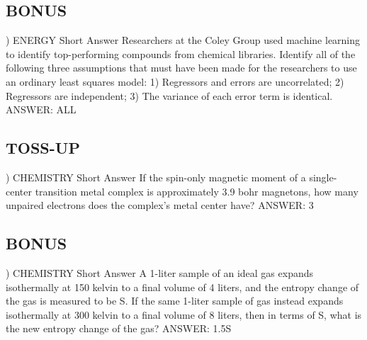 \documentclass{article}
\begin{document}
\subsection*{BONUS}
) ENERGY Short Answer Researchers at the Coley Group used machine learning to identify top-performing compounds from chemical libraries. Identify all of the following three assumptions that must have been made for the researchers to use an ordinary least squares model: 1) Regressors and errors are uncorrelated; 2) Regressors are independent; 3) The variance of each error term is identical.
\noindent ANSWER: ALL

\subsection*{TOSS-UP}
) CHEMISTRY Short Answer If the spin-only magnetic moment of a single-center transition metal complex is approximately 3.9 bohr magnetons, how many unpaired electrons does the complex's metal center have?
\noindent ANSWER: 3

\subsection*{BONUS}
) CHEMISTRY Short Answer A 1-liter sample of an ideal gas expands isothermally at 150 kelvin to a final volume of 4 liters, and the entropy change of the gas is measured to be S. If the same 1-liter sample of gas instead expands isothermally at 300 kelvin to a final volume of 8 liters, then in terms of S, what is the new entropy change of the gas?
\noindent ANSWER: 1.5S
\end{document}
